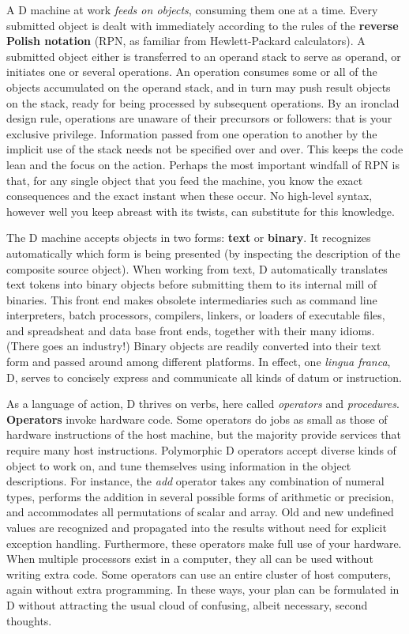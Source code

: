 A  D  machine at work \emph{feeds on objects},  consuming them one at  a  time. Every submitted object is dealt with immediately according to the rules of the  \textbf{reverse  Polish  notation} (RPN,  as  familiar  from  Hewlett-Packard calculators). A submitted object either is transferred to an operand stack to serve as operand, or initiates one or several operations. An operation consumes some or all of the objects accumulated on the operand stack, and in turn may push result objects on the stack,  ready for being  processed by  subsequent operations.  By an ironclad design  rule,  operations  are unaware  of  their  precursors  or  followers: that  is  your  exclusive privilege.  Information  passed  from one operation to  another  by  the implicit  use of the stack needs not be specified over and over.  This keeps  the  code lean and the focus on the action.  Perhaps the most important windfall of RPN is that, for any single object that you feed the machine, you know  the exact consequences and the exact instant when these occur.  No high-level syntax, however well you keep abreast with its twists, can substitute for this knowledge.

The  D  machine  accepts  objects in  two  forms:  \textbf{text} or  \textbf{binary}.  It recognizes automatically which form is being presented (by inspecting the description of the composite source object).  When working from  text,  D automatically   translates  text  tokens  into  binary   objects  before submitting  them to its internal mill of binaries.  This front end  makes obsolete  intermediaries  such  as  command  line   interpreters,   batch processors,  compilers, linkers, or loaders of executable files, and spreadsheat and data base front ends, together with their many idioms. (There goes an industry!)  Binary objects are readily converted into their text form and passed around among different platforms. In effect, one \emph{lingua franca}, D, serves to concisely express and communicate all kinds of datum or instruction.

As a language of action,  D thrives on verbs,  here called \emph{operators} and \emph{procedures}. \textbf{Operators} invoke hardware code.  Some  operators  do jobs as small as  those  of  hardware instructions of the host machine,  but the majority provide services that require  many host instructions.  Polymorphic D operators accept  diverse kinds of object to work on,  and tune themselves using information in the object  descriptions.   For  instance,   the  \emph{add}  operator  takes  any combination of numeral types,  performs the addition in several  possible forms of arithmetic or precision,  and accommodates all permutations of scalar and array.  Old and new  undefined  values  are recognized  and  propagated into the results without  need  for  explicit exception handling. Furthermore, these operators make full use of your hardware. When multiple processors exist in a computer, they all can be used without writing extra code. Some operators can use an entire cluster of host computers, again without extra programming. In these ways, your plan can be formulated in D without  attracting the usual cloud of confusing, albeit necessary, second thoughts.

